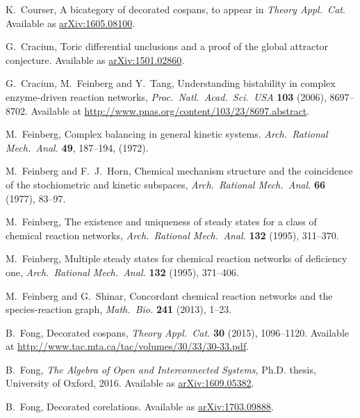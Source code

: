 \documentclass{compositionalityarticle}
\theoremstyle{plain}
\theoremstyle{remark}
\begin{document}
\begin{thebibliography}{9}
 K.\ Courser, A bicategory of decorated cospans, to appear in \textsl{Theory Appl.\ Cat}.  Available as \href{https://arxiv.org/abs/1605.08100}{arXiv:1605.08100}.

 G.\ Craciun, Toric differential unclusions and a proof of the global attractor conjecture.  Available as \href{https://arxiv.org/abs/1501.02860}{arXiv:1501.02860}.

 G.\ Craciun, M.\ Feinberg and Y.\ Tang, Understanding bistability in complex enzyme-driven reaction networks, \textsl{Proc.\ Natl.\ Acad.\ Sci.\ USA} \textbf{103} (2006), 8697--8702. Available at  \hfill \break \href{http://www.pnas.org/content/103/23/8697.abstract}{http://www.pnas.org/content/103/23/8697.abstract}.

 M.\ Feinberg, Complex balancing in general kinetic systems. \textsl{Arch.\ Rational Mech.\ Anal.} \textbf{49}, 187--194, (1972). 

 M.\ Feinberg and F.\ J.\ Horn, Chemical mechanism structure and the coincidence of the stochiometric and kinetic subspaces, \textsl{Arch.\ Rational Mech.\ Anal.} \textbf{66} (1977), 83--97.

 M.\ Feinberg, The existence and uniqueness of steady states for a class of chemical reaction networks, \textsl{Arch.\ Rational Mech.\ Anal.} \textbf{132} (1995), 311--370.  

 M.\ Feinberg, Multiple steady states for chemical reaction networks of deficiency one, \textsl{Arch.\ Rational Mech.\ Anal.} \textbf{132} (1995), 371--406. 

  M.\ Feinberg and G.\ Shinar, Concordant chemical reaction networks and the species-reaction graph, \textsl{Math.\ Bio.} \textbf{241} (2013), 1--23.

 B.\ Fong, Decorated cospans, \textsl{Theory Appl.\ Cat.} \textbf{30} (2015), 1096--1120. Available at \href{http://www.tac.mta.ca/tac/volumes/30/33/30-33.pdf}{http://www.tac.mta.ca/tac/volumes/30/33/30-33.pdf}.

 B.\ Fong, \textsl{The Algebra of Open and Interconnected Systems}, Ph.D. thesis, University of Oxford, 2016.  Available as \href{https://arxiv.org/abs/1609.05382}{arXiv:1609.05382}.

 B.\ Fong, Decorated corelations.  Available as \href{https://arxiv.org/abs/1703.09888}{arXiv:1703.09888}.


\end{thebibliography}
\end{document}
